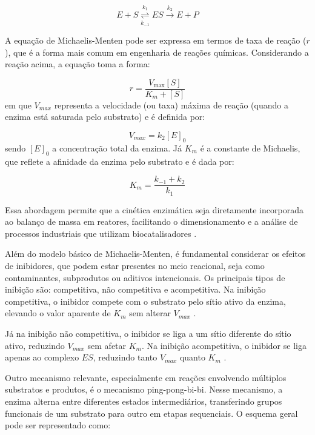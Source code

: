\documentclass[12pt,oneside]{report}
\begin{document}
\begin{equation}
    E + S \overset{k_1}{\underset{k_{-1}}{\rightleftharpoons}} ES \xrightarrow{k_2} E + P
\end{equation}

A equação de Michaelis-Menten pode ser expressa em termos de taxa de reação ($r$), que é a forma mais comum em engenharia de reações químicas. Considerando a reação acima, a equação toma a forma:

\begin{equation}
    r = \frac{V_{\text{max}} [S]}{K_m + [S]}
\end{equation}
em que $V_{max}$ representa a velocidade (ou taxa) máxima de reação (quando a enzima está saturada pelo substrato) e é definida por:

\begin{equation}
    V_{max} = k_2[E]_0
\end{equation}
sendo $[E]_0$ a concentração total da enzima. Já $K_m$ é a constante de Michaelis, que reflete a afinidade da enzima pelo substrato e é dada por:

\begin{equation}
    K_m = \frac{k_{-1} + k_2}{k_1}
\end{equation}

Essa abordagem permite que a cinética enzimática seja diretamente incorporada ao balanço de massa em reatores, facilitando o dimensionamento e a análise de processos industriais que utilizam biocatalisadores \cite{FOGLER_2016}.

Além do modelo básico de Michaelis-Menten, é fundamental considerar os efeitos de inibidores, que podem estar presentes no meio reacional, seja como contaminantes, subprodutos ou aditivos intencionais. Os principais tipos de inibição são: competitiva, não competitiva e acompetitiva. Na inibição competitiva, o inibidor compete com o substrato pelo sítio ativo da enzima, elevando o valor aparente de
$K_m$ sem alterar $V_{max}$ \cite{FOGLER_2016}.

Já na inibição não competitiva, o inibidor se liga a um sítio diferente do sítio ativo, reduzindo $V_{max}$ sem afetar $K_m$. Na inibição acompetitiva, o inibidor se liga apenas ao complexo $ES$, reduzindo tanto $V_{max}$ quanto $K_m$ \cite{FOGLER_2016}.


Outro mecanismo relevante, especialmente em reações envolvendo múltiplos substratos e produtos, é o mecanismo ping-pong-bi-bi. Nesse mecanismo, a enzima alterna entre diferentes estados intermediários, transferindo grupos funcionais de um substrato para outro em etapas sequenciais. O esquema geral pode ser representado como:
\end{document}
